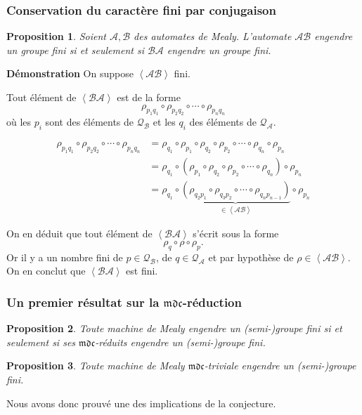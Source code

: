 \documentclass[11pt]{beamer}
\newtheorem{prop}{Proposition}
\begin{document}
\begin{frame}
  \frametitle{Conservation du caractère fini par conjugaison}

  \begin{prop} %
    Soient $\mathcal{A}, \mathcal{B}$ des automates de Mealy.
    L'automate $\mathcal{A}\mathcal{B}$ engendre un groupe fini si et seulement si $\mathcal{B}\mathcal{A}$ engendre un groupe fini.
  \end{prop}

  \textbf{Démonstration}
  On suppose $\left<\mathcal{A}\mathcal{B}\right>$ fini.

  Tout élément de $\left<\mathcal{B}\mathcal{A}\right>$ est de la forme
  \[
    \rho_{p_1q_1}\circ\rho_{p_2q_2}\circ\cdots\circ\rho_{p_nq_n}
  \]
  où les $p_i$ sont des éléments de $\mathcal{Q}_\mathcal{B}$ et les $q_i$ des éléments de $\mathcal{Q}_\mathcal{A}$.
\end{frame}

\begin{frame}
  \begin{align*}
    \rho_{p_1q_1}\circ\rho_{p_2q_2}\circ\cdots\circ\rho_{p_nq_n} &= \rho_{q_1}\circ\rho_{p_1}\circ\rho_{q_2}\circ\rho_{p_2}\circ\cdots\circ\rho_{q_n}\circ\rho_{p_n} \\
    &=\rho_{q_1}\circ\left(\rho_{p_1}\circ\rho_{q_2}\circ\rho_{p_2}\circ\cdots\circ\rho_{q_n}\right)\circ\rho_{p_n} \\
    &=\rho_{q_1}\circ\underbrace{\left(\rho_{q_2p_1}\circ\rho_{q_3p_2}\circ\cdots\circ\rho_{q_np_{n-1}}\right)}_{\in\left<\mathcal{A}\mathcal{B}\right>}\circ\rho_{p_n}
  \end{align*}

  On en déduit que tout élément de $\left<\mathcal{B}\mathcal{A}\right>$ s'écrit sous la forme
  \[ \rho_q\circ\rho\circ\rho_p. \] Or il y a un nombre fini de $p\in\mathcal{Q}_\mathcal{B}$, de $q\in\mathcal{Q}_\mathcal{A}$ et par hypothèse de $\rho\in\left<\mathcal{AB}\right>$. On en conclut que $\left<\mathcal{BA}\right>$ est fini.

\end{frame}

\begin{frame}
  \frametitle{Un premier résultat sur la $\mathfrak{mdc}$-réduction}
  \begin{prop}
    Toute machine de Mealy engendre un (semi-)groupe fini si et seulement si ses $\mathfrak{mdc}$-réduits engendre un (semi-)groupe fini.
  \end{prop}

  \begin{prop}
    Toute machine de Mealy $\mathfrak{mdc}$-triviale engendre un (semi-)groupe fini.
  \end{prop}

  Nous avons donc prouvé une des implications de la conjecture.
\end{frame}
\end{document}
